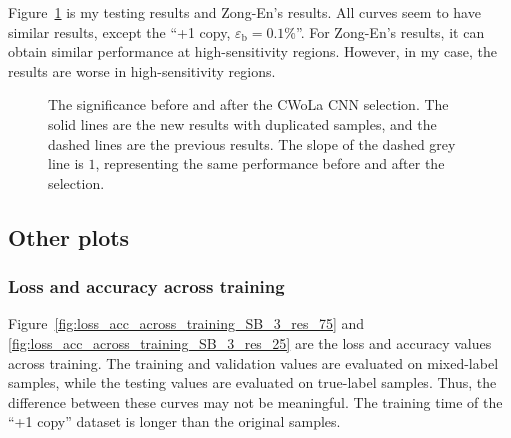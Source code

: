 \documentclass[12pt]{article}
\begin{document}
		Figure~\ref{fig:sensitivity_improvement_bkg_eff_copy_1_our_ZN_testing} is my testing results and Zong-En's results. All curves seem to have similar results, except the ``+1 copy, $\varepsilon_{\text{b}} = 0.1\%$''. For Zong-En's results, it can obtain similar performance at high-sensitivity regions. However, in my case, the results are worse in high-sensitivity regions.
		\begin{figure}[htpb]
			\centering
			\caption{The significance before and after the CWoLa CNN selection. The solid lines are the new results with duplicated samples, and the dashed lines are the previous results. The slope of the dashed grey line is $1$, representing the same performance before and after the selection.}
			\label{fig:sensitivity_improvement_bkg_eff_copy_1_our_ZN_testing}
		\end{figure}
	\subsection{Other plots}%
	\label{sub:other_plots}
		\subsubsection{Loss and accuracy across training}%
		\label{subs:loss_and_accuracy_across_training}
			Figure~\ref{fig:loss_acc_across_training_SB_3_res_75} and \ref{fig:loss_acc_across_training_SB_3_res_25} are the loss and accuracy values across training. The training and validation values are evaluated on mixed-label samples, while the testing values are evaluated on true-label samples. Thus, the difference between these curves may not be meaningful. The training time of the ``+1 copy'' dataset is longer than the original samples.
\end{document}
